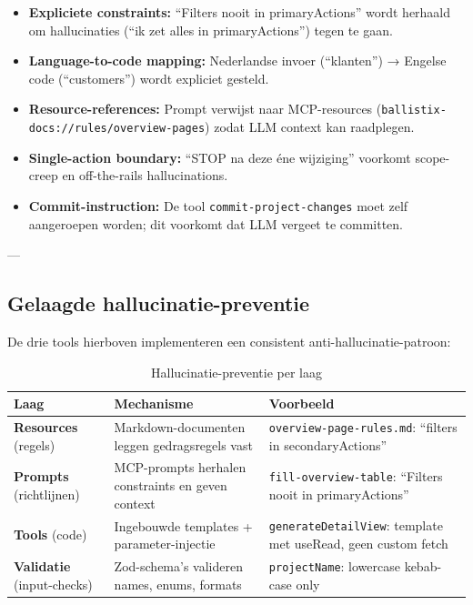 \begin{itemize}
  \item \textbf{Expliciete constraints:} ``Filters nooit in primaryActions'' wordt herhaald om hallucinaties (``ik zet alles in primaryActions'') tegen te gaan.
  \item \textbf{Language-to-code mapping:} Nederlandse invoer (``klanten'') → Engelse code (``customers'') wordt expliciet gesteld.
  \item \textbf{Resource-references:} Prompt verwijst naar MCP-resources (\texttt{ballistix-docs://rules/overview-pages}) zodat LLM context kan raadplegen.
  \item \textbf{Single-action boundary:} ``STOP na deze éne wijziging'' voorkomt scope-creep en off-the-rails hallucinations.
  \item \textbf{Commit-instruction:} De tool \texttt{commit-project-changes} moet zelf aangeroepen worden; dit voorkomt dat LLM vergeet te committen.
\end{itemize}

---

\subsection{Gelaagde hallucinatie-preventie}

De drie tools hierboven implementeren een consistent anti-hallucinatie-patroon:

\begin{table}[htbp]
  \centering
  \caption{Hallucinatie-preventie per laag}
  \label{tab:hallucination-prevention}
  \small
  \begin{tabularx}{\textwidth}{|l|l|l|}
    \hline
    \textbf{Laag} & \textbf{Mechanisme} & \textbf{Voorbeeld} \\
    \hline
    \textbf{Resources} (regels) &
    Markdown-documenten leggen gedragsregels vast &
    \texttt{overview-page-rules.md}: ``filters in secondaryActions'' \\
    \hline
    \textbf{Prompts} (richtlijnen) &
    MCP-prompts herhalen constraints en geven context &
    \texttt{fill-overview-table}: ``Filters nooit in primaryActions'' \\
    \hline
    \textbf{Tools} (code) &
    Ingebouwde templates + parameter-injectie &
    \texttt{generateDetailView}: template met useRead, geen custom fetch \\
    \hline
    \textbf{Validatie} (input-checks) &
    Zod-schema's valideren names, enums, formats &
    \texttt{projectName}: lowercase kebab-case only \\
    \hline
  \end{tabularx}
\end{table}

